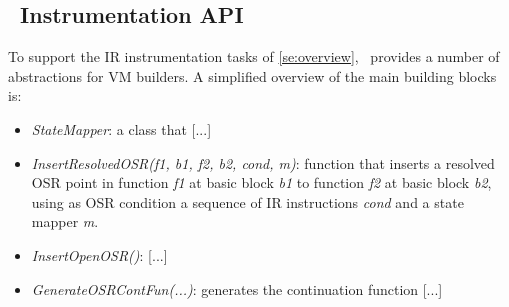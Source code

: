 \subsection{\osrkit\ Instrumentation API}
\label{se:instrum-api}
To support the IR instrumentation tasks of \mysection\ref{se:overview}, \osrkit\ provides a number of abstractions for VM builders. A simplified overview of the main building blocks is:
\begin{itemize}
\item {\em StateMapper}: a class that [...]
\item {\em InsertResolvedOSR(f1, b1, f2, b2, cond, m)}: function that inserts a resolved OSR point in function {\em f1} at basic block {\em b1} to function {\em f2} at basic block {\em b2}, using as OSR condition a sequence of IR instructions {\em cond} and a state mapper {\em m}.
\item {\em InsertOpenOSR()}: [...]
\item {\em GenerateOSRContFun(...)}: generates the continuation function [...]
\end{itemize}
                              







  

  
  
  
  